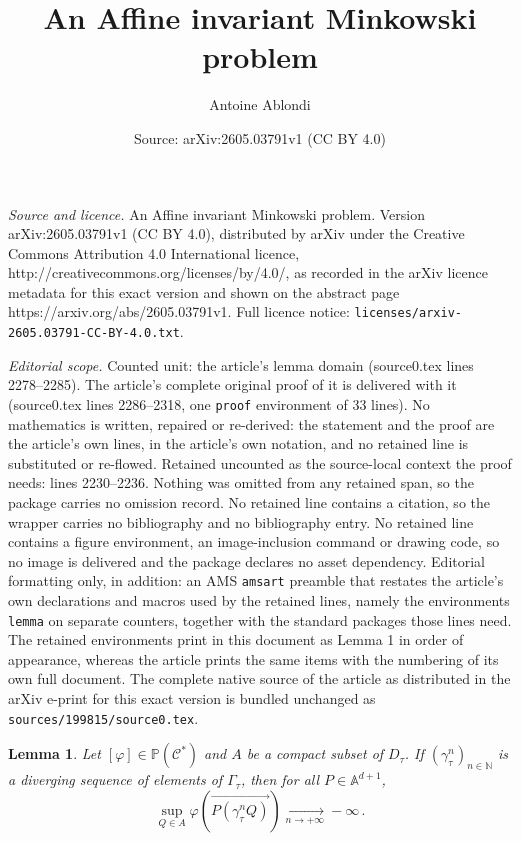 \documentclass[10pt,a4paper]{amsart}
\title{An Affine invariant Minkowski problem}
\author{Antoine Ablondi}
\date{Source: arXiv:2605.03791v1 (CC BY 4.0)}
\newtheorem{lemma}{Lemma}
\newcommand{\A}{\mathbb{A}} %
\newcommand{\C}{\mathcal{C}} %
\newcommand{\N}{\mathbb{N}} %
\renewcommand{\P}{\mathbb{P}} %
\newcommand{\vp}[1]{{\left( {#1} \right)}} %
\begin{document}
\maketitle

\noindent\emph{Source and licence.} An Affine invariant Minkowski problem. Version arXiv:2605.03791v1 (CC BY 4.0), distributed by arXiv under the Creative Commons Attribution 4.0 International licence, http://creativecommons.org/licenses/by/4.0/, as recorded in the arXiv licence metadata for this exact version and shown on the abstract page https://arxiv.org/abs/2605.03791v1. Full licence notice: \texttt{licenses/arxiv-2605.03791-CC-BY-4.0.txt}.\par\smallskip

\noindent\textit{Editorial scope.} Counted unit: the article's lemma domain (source0.tex lines 2278--2285). The article's complete original proof of it is delivered with it (source0.tex lines 2286--2318, one \texttt{proof} environment of 33 lines). No mathematics is written, repaired or re-derived: the statement and the proof are the article's own lines, in the article's own notation, and no retained line is substituted or re-flowed.  Retained uncounted as the source-local context the proof needs: lines 2230--2236.  Nothing was omitted from any retained span, so the package carries no omission record.  No retained line contains a citation, so the wrapper carries no bibliography and no bibliography entry.  No retained line contains a figure environment, an image-inclusion command or drawing code, so no image is delivered and the package declares no asset dependency.  Editorial formatting only, in addition: an AMS \texttt{amsart} preamble that restates the article's own declarations and macros used by the retained lines, namely the environments \texttt{lemma} on separate counters, together with the standard packages those lines need.  The retained environments print in this document as Lemma 1 in order of appearance, whereas the article prints the same items with the numbering of its own full document.  The complete native source of the article as distributed in the arXiv e-print for this exact version is bundled unchanged as \texttt{sources/199815/source0.tex}.
\begin{lemma}
\label{lem scalar product to - infty}
Let $[\varphi] \in \P(\C^*)$ and $A$ be a compact subset of $D_\tau$. If $(\gamma^n_\tau)_{n\in \N}$ is a diverging sequence of elements of $\Gamma_\tau$, then for all $P \in \A^{d+1}$,
\begin{equation*}
 \sup_{Q \in A} \varphi\vp{ \overrightarrow{P(\gamma^n_\tau Q)}} \xrightarrow[n \to +\infty]{} -\infty \, . 
\end{equation*}
\end{lemma}
\end{document}

